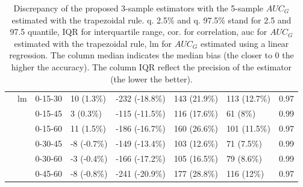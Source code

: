 \documentclass[12pt]{article}
\begin{document}
\begin{table}[ht]
\begin{adjustwidth}{-1cm}{}
\begin{tabular}{lllllllr}
   & lm & 0-15-30 & 10 (1.3\%) & -232 (-18.8\%) & 143 (21.9\%) & 113 (12.7\%) & 0.97 \\ [1mm]
   &  & 0-15-45 & 3 (0.3\%) & -115 (-11.5\%) & 116 (17.6\%) & 61 (8\%) & 0.99 \\ 
   &  & 0-15-60 & 11 (1.5\%) & -186 (-16.7\%) & 160 (26.6\%) & 101 (11.5\%) & 0.97 \\ 
   &  & 0-30-45 & -8 (-0.7\%) & -149 (-13.4\%) & 103 (12.6\%) & 71 (7.5\%) & 0.99 \\ 
   &  & 0-30-60 & -3 (-0.4\%) & -166 (-17.2\%) & 105 (16.5\%) & 79 (8.6\%) & 0.99 \\ 
   &  & 0-45-60 & -8 (-0.8\%) & -241 (-20.9\%) & 177 (28.8\%) & 116 (12\%) & 0.97 \\ 
   \hline
\end{tabular}
\caption{Discrepancy of the proposed 3-sample estimators with the 5-sample \(AUC_G\) estimated with the trapezoidal rule.
q. 2.5\% and q. 97.5\% stand for 2.5 and 97.5 quantile, IQR for interquartile range, cor. for correlation,
auc for \(AUC_G\) estimated with the trapezoidal rule, lm for \(AUC_G\) estimated using a linear regression.
The column median indicates the median bias (the closer to 0 the higher the accuracy).
The column IQR reflect the precision of the estimator (the lower the better).}
\label{tab:AUCg-perfEstimator}
\end{adjustwidth}
\end{table}
\end{document}
